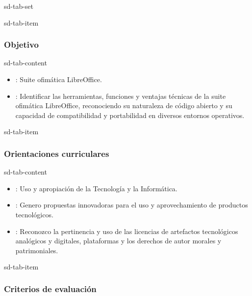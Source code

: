 \documentclass[letterpaper,10pt,spanish]{sphinxmanual}
\begin{document}
\begin{sphinxuseclass}{sd-tab-set}
\begin{sphinxuseclass}{sd-tab-item}\subsubsection*{Objetivo}

\begin{sphinxuseclass}{sd-tab-content}\begin{itemize}
\item {} 
\sphinxAtStartPar
{}: Suite ofimática LibreOffice.

\item {} 
\sphinxAtStartPar
{}: Identificar las herramientas, funciones y ventajas técnicas de la suite ofimática LibreOffice, reconociendo su naturaleza de código abierto y su capacidad de compatibilidad y portabilidad en diversos entornos operativos.

\end{itemize}

\end{sphinxuseclass}
\end{sphinxuseclass}
\begin{sphinxuseclass}{sd-tab-item}\subsubsection*{Orientaciones curriculares}

\begin{sphinxuseclass}{sd-tab-content}\begin{itemize}
\item {} 
\sphinxAtStartPar
{}: Uso y apropiación de la Tecnología y la Informática.

\item {} 
\sphinxAtStartPar
{}: Genero propuestas innovadoras para el uso y aprovechamiento de productos tecnológicos.

\item {} 
\sphinxAtStartPar
{}: Reconozco la pertinencia y uso de las licencias de artefactos tecnológicos analógicos y digitales, plataformas y los derechos de autor morales y patrimoniales.

\end{itemize}

\end{sphinxuseclass}
\end{sphinxuseclass}
\begin{sphinxuseclass}{sd-tab-item}\subsubsection*{Criterios de evaluación}


\end{sphinxuseclass}
\end{sphinxuseclass}
\end{document}

